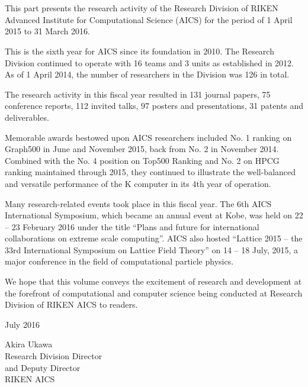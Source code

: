 \chapter*{}

This part presents the research activity of the Research Division of RIKEN Advanced Institute for Computational Science (AICS) for the period of 1 April 2015 to 31 March 2016.

This is the sixth year for AICS since its foundation in 2010.  The Research Division continued to operate with 16 teams and 3 units as established in 2012.  As of 1 April 2014, the number of researchers in the Division was 126 in total.

The research activity in this fiscal year resulted in 131 journal papers, 75 conference reports, 112 invited talks, 97 posters and presentations, 31 patents and deliverables.

Memorable awards bestowed upon AICS researchers included No. 1 ranking on Graph500 in June and November 2015, back from No. 2 in November 2014.  Combined with the No. 4 position on Top500 Ranking and No. 2 on HPCG ranking maintained through 2015, they continued to illustrate the well-balanced and versatile performance of the K computer in its 4th year of operation.

Many research-related events took place in this fiscal year.  The 6th AICS International Symposium, which became an annual event at Kobe, was held on 22 – 23 February 2016 under the title “Plans and future for international collaborations on extreme scale computing”.  AICS also hosted “Lattice 2015 – the 33rd International Symposium on Lattice Field Theory” on 14 – 18 July, 2015, a major conference in the field of computational particle physics.

We hope that this volume conveys the excitement of research and development at the forefront of computational and computer science being conducted at Research Division of RIKEN AICS to readers.

\vspace{1cm}

\noindent
July 2016

\begin{flushright}
Akira Ukawa\\
Research Division Director\\
and Deputy Director\\
RIKEN AICS
\end{flushright}
